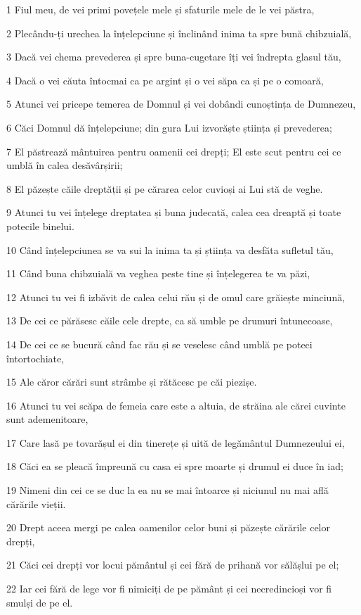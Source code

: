 \par 1 Fiul meu, de vei primi povețele mele și sfaturile mele de le vei păstra,
\par 2 Plecându-ți urechea la înțelepciune și înclinând inima ta spre bună chibzuială,
\par 3 Dacă vei chema prevederea și spre buna-cugetare îți vei îndrepta glasul tău,
\par 4 Dacă o vei căuta întocmai ca pe argint și o vei săpa ca și pe o comoară,
\par 5 Atunci vei pricepe temerea de Domnul și vei dobândi cunoștința de Dumnezeu,
\par 6 Căci Domnul dă înțelepciune; din gura Lui izvorăște știința și prevederea;
\par 7 El păstrează mântuirea pentru oamenii cei drepți; El este scut pentru cei ce umblă în calea desăvârșirii;
\par 8 El păzește căile dreptății și pe cărarea celor cuvioși ai Lui stă de veghe.
\par 9 Atunci tu vei înțelege dreptatea și buna judecată, calea cea dreaptă și toate potecile binelui.
\par 10 Când înțelepciunea se va sui la inima ta și știința va desfăta sufletul tău,
\par 11 Când buna chibzuială va veghea peste tine și înțelegerea te va păzi,
\par 12 Atunci tu vei fi izbăvit de calea celui rău și de omul care grăiește minciună,
\par 13 De cei ce părăsesc căile cele drepte, ca să umble pe drumuri întunecoase,
\par 14 De cei ce se bucură când fac rău și se veselesc când umblă pe poteci întortochiate,
\par 15 Ale căror cărări sunt strâmbe și rătăcesc pe căi piezișe.
\par 16 Atunci tu vei scăpa de femeia care este a altuia, de străina ale cărei cuvinte sunt ademenitoare,
\par 17 Care lasă pe tovarășul ei din tinerețe și uită de legământul Dumnezeului ei,
\par 18 Căci ea se pleacă împreună cu casa ei spre moarte și drumul ei duce în iad;
\par 19 Nimeni din cei ce se duc la ea nu se mai întoarce și niciunul nu mai află cărările vieții.
\par 20 Drept aceea mergi pe calea oamenilor celor buni și păzește cărările celor drepți,
\par 21 Căci cei drepți vor locui pământul și cei fără de prihană vor sălășlui pe el;
\par 22 Iar cei fără de lege vor fi nimiciți de pe pământ și cei necredincioși vor fi smulși de pe el.


